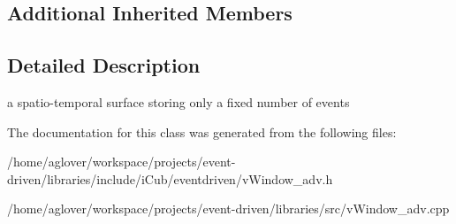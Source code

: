 \subsection*{Additional Inherited Members}


\subsection{Detailed Description}
a spatio-\/temporal surface storing only a fixed number of events 

The documentation for this class was generated from the following files\+:\begin{DoxyCompactItemize}
\item 
/home/aglover/workspace/projects/event-\/driven/libraries/include/i\+Cub/eventdriven/v\+Window\+\_\+adv.\+h\item 
/home/aglover/workspace/projects/event-\/driven/libraries/src/v\+Window\+\_\+adv.\+cpp\end{DoxyCompactItemize}
